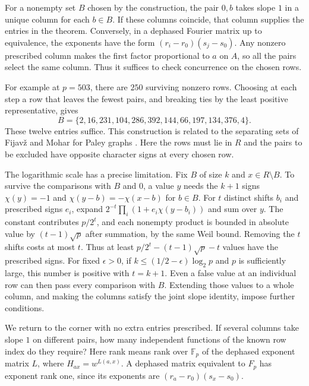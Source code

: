 \documentclass[11pt,a4paper]{article}
\numberwithin{equation}{section}
\begin{document}
For a nonempty set $B$ chosen by the construction, the pair $0,b$ takes slope $1$ in a unique column for each $b\in B$. If these columns coincide, that column supplies the entries in the theorem. Conversely, in a dephased Fourier matrix up to equivalence, the exponents have the form $(r_i-r_0)(s_j-s_0)$. Any nonzero prescribed column makes the first factor proportional to $a$ on $A$, so all the pairs select the same column. Thus it suffices to check concurrence on the chosen rows.

For example at $p=503$, there are $250$ surviving nonzero rows. Choosing at each step a row that leaves the fewest pairs, and breaking ties by the least positive representative, gives
$$B=\{2,16,231,104,286,392,144,66,197,134,376,4\}.$$
These twelve entries suffice. This construction is related to the separating sets of Fijav\v{z} and Mohar for Paley graphs \cite{fm}. Here the rows must lie in $R$ and the pairs to be excluded have opposite character signs at every chosen row.

The logarithmic scale has a precise limitation. Fix $B$ of size $k$ and $x\in R\setminus B$. To survive the comparisons with $B$ and $0$, a value $y$ needs the $k+1$ signs $\chi(y)=-1$ and $\chi(y-b)=-\chi(x-b)$ for $b\in B$. For $t$ distinct shifts $b_i$ and prescribed signs $e_i$, expand $2^{-t}\prod_i(1+e_i\chi(y-b_i))$ and sum over $y$. The constant contributes $p/2^t$, and each nonempty product is bounded in absolute value by $(t-1)\sqrt p$ after summation, by the same Weil bound. Removing the $t$ shifts costs at most $t$. Thus at least $p/2^t-(t-1)\sqrt p-t$ values have the prescribed signs. For fixed $\epsilon>0$, if $k\le(1/2-\epsilon)\log_2 p$ and $p$ is sufficiently large, this number is positive with $t=k+1$. Even a false value at an individual row can then pass every comparison with $B$. Extending those values to a whole column, and making the columns satisfy the joint slope identity, impose further conditions.

We return to the corner with no extra entries prescribed. If several columns take slope $1$ on different pairs, how many independent functions of the known row index do they require? Here rank means rank over $\mathbb F_p$ of the dephased exponent matrix $L$, where $H_{ax}=w^{L(a,x)}$. A dephased matrix equivalent to $F_p$ has exponent rank one, since its exponents are $(r_a-r_0)(s_x-s_0)$.
\end{document}
